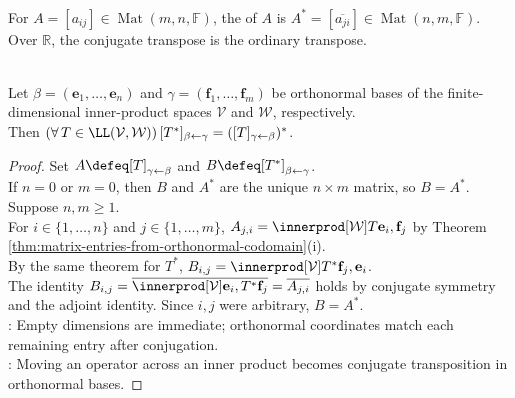 \begin{definition} \label{def:conjugate-transpose} \\
For $A=[a_{ij}]\in\operatorname{Mat}(m,n,\mathbb{F})$, the  of $A$ is $A^*=[\overline{a_{ji}}]\in\operatorname{Mat}(n,m,\mathbb{F})$.\\
Over $\mathbb{R}$, the conjugate transpose is the ordinary transpose.
\end{definition}

\begin{theorem} \label{thm:matrix-of-adjoint-is-conjugate-transpose} \\
Let $\beta=(\mathbf{e}_1,\ldots,\mathbf{e}_n)$ and $\gamma=(\mathbf{f}_1,\ldots,\mathbf{f}_m)$ be orthonormal bases of the finite-dimensional inner-product spaces $\mathcal{V}$ and $\mathcal{W}$, respectively.\\
Then $(\forall\,T\in\LL(\mathcal{V},\mathcal{W}))\,[T^*]_{\beta\leftarrow\gamma}=([T]_{\gamma\leftarrow\beta})^*$.
\begin{proof}
Set $A\defeq[T]_{\gamma\leftarrow\beta}$ and $B\defeq[T^*]_{\beta\leftarrow\gamma}$.\\
If $n=0$ or $m=0$, then $B$ and $A^*$ are the unique $n\times m$ matrix, so $B=A^*$. Suppose $n,m\geq1$.\\
For $i\in\{1,\ldots,n\}$ and $j\in\{1,\ldots,m\}$, $A_{j,i}=\innerprod[\mathcal{W}]{T\mathbf{e}_i,\mathbf{f}_j}$ by Theorem \ref{thm:matrix-entries-from-orthonormal-codomain}(i).\\
By the same theorem for $T^*$, $B_{i,j}=\innerprod[\mathcal{V}]{T^*\mathbf{f}_j,\mathbf{e}_i}$.\\
The identity $B_{i,j}=\overline{\innerprod[\mathcal{V}]{\mathbf{e}_i,T^*\mathbf{f}_j}}=\overline{A_{j,i}}$ holds by conjugate symmetry and the adjoint identity. Since $i,j$ were arbitrary, $B=A^*$.\\
: Empty dimensions are immediate; orthonormal coordinates match each remaining entry after conjugation.\\
: Moving an operator across an inner product becomes conjugate transposition in orthonormal bases.
\end{proof}
\end{theorem}

